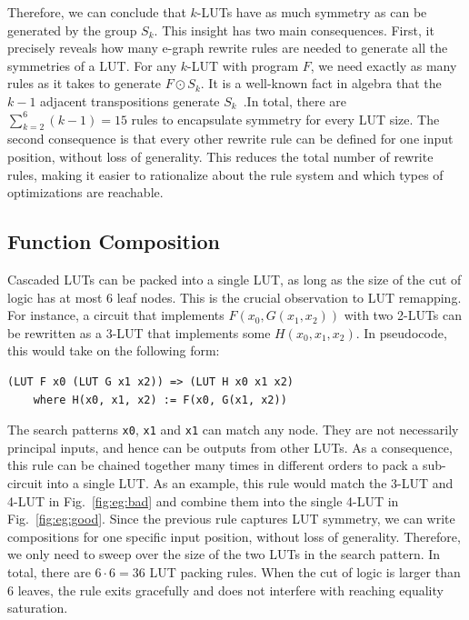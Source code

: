Therefore, we can conclude that $k$-LUTs have as much symmetry as can be
generated by the group $S_k$. This insight has two main consequences. First, it
precisely reveals how many e-graph rewrite rules are needed to generate all the
symmetries of a LUT. For any $k$-LUT with program $F$, we need exactly as many
rules as it takes to generate $F \odot S_k$. It is a well-known fact in algebra
that the $k-1$ adjacent transpositions generate $S_k$~\cite{sgroup}.In total,
there are $\sum_{k=2}^{6} (k-1) = 15$ rules to encapsulate symmetry for every
LUT size. The second consequence is that every other rewrite rule can be
defined for one input position, without loss of generality. This reduces the
total number of rewrite rules, making it easier to rationalize about the rule
system and which types of optimizations are reachable.

\subsection{Function Composition}\label{sec:rewrites:composition}

Cascaded LUTs can be packed into a single LUT, as long as the size of the cut
of logic has at most 6 leaf nodes. This is the crucial observation to LUT
remapping. For instance, a circuit that implements $F(x_0, G(x_1, x_2))$ with
two 2-LUTs can be rewritten as a 3-LUT that implements some $H(x_0, x_1, x_2)$.
In pseudocode, this would take on the following form:

\begin{lstlisting}
(LUT F x0 (LUT G x1 x2)) => (LUT H x0 x1 x2)
    where H(x0, x1, x2) := F(x0, G(x1, x2))
\end{lstlisting}

The search patterns \texttt{x0}, \texttt{x1} and \texttt{x1} can match any
node. They are not necessarily principal inputs, and hence can be outputs from
other LUTs. As a consequence, this rule can be chained together many times in
different orders to pack a sub-circuit into a single LUT. As an example, this
rule would match the 3-LUT and 4-LUT in Fig.~\ref{fig:eg:bad} and combine them
into the single 4-LUT in Fig.~\ref{fig:eg:good}. Since the previous rule
captures LUT symmetry, we can write compositions for one specific input
position, without loss of generality. Therefore, we only need to sweep over the
size of the two LUTs in the search pattern. In total, there are $6 \cdot 6 =
    36$ LUT packing rules. When the cut of logic is larger than 6 leaves, the rule
exits gracefully and does not interfere with reaching equality saturation.

